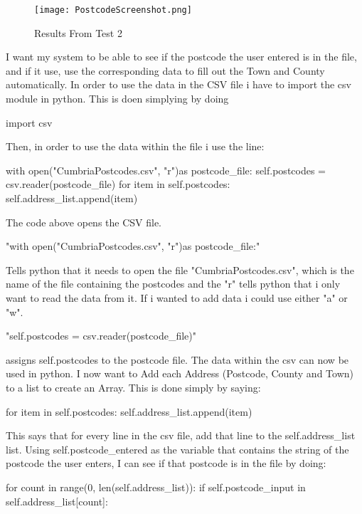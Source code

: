\begin{figure}[H]
\caption{Results From Test 2} \label{fig:Results From Test 2}
\hfill\texttt{[image: PostcodeScreenshot.png]}\hspace*{\fill}
\end{figure}

I want my system to be able to see if the postcode the user entered is in the file, and if it use, use the corresponding data to fill out the Town and County automatically. In order to use the data in the CSV file i have to import the csv module in python. This is doen simplying by doing \begin{python} import csv \end{python} Then, in order to use the data within the file i use the line:

\begin{python}
with open("CumbriaPostcodes.csv", "r")as postcode_file:
                        self.postcodes = csv.reader(postcode_file)
                        for item in self.postcodes:
                                self.address_list.append(item)
\end{python}

The code above opens the CSV file.  \begin{python} "with open("CumbriaPostcodes.csv", "r")as postcode_file:"\end{python} Tells python that it needs to open the file "CumbriaPostcodes.csv", which is the name of the file containing the postcodes and the "r" tells python that i only want to read the data from it. If i wanted to add data i could use either "a" or "w".  \begin{python} "self.postcodes = csv.reader(postcode_file)"  \end{python} assigns self.postcodes to the postcode file. The data within the csv can now be used in python. I now want to Add each Address (Postcode, County and Town) to a list to create an Array. This is done simply by saying:

\begin{python}
 for item in self.postcodes:
                                self.address_list.append(item)
\end{python}

This says that for every line in the csv file, add that line to the self.address_list list. Using self.postcode_entered as the variable that contains the string of the postcode the user enters, I can see if that postcode is in the file by doing:
\begin{python}
for count in range(0, len(self.address_list)):
                                if self.postcode_input in self.address_list[count]:
\end{python}

